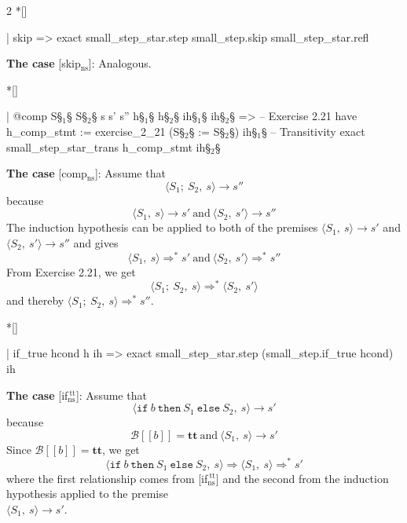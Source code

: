 \begin{paracol}{2}
\switchcolumn[1]*[]
\begin{leftcolumn}
    \begin{Lean_Code}
  | skip =>
    exact small_step_star.step
      small_step.skip
      small_step_star.refl
    \end{Lean_Code}
\end{leftcolumn}
\begin{rightcolumn}
\textbf{The case} [skip$_{\text{ns}}$]: Analogous.
\end{rightcolumn}
\vspace{2em}


\switchcolumn[1]*[]
\begin{leftcolumn}
    \begin{Lean_Code}
  | @comp S§\(_1\)§ S§\(_2\)§ s s' s''
    h§\(_1\)§ h§\(_2\)§ ih§\(_1\)§ ih§\(_2\)§ =>
    -- Exercise 2.21
    have h_comp_stmt :=
      exercise_2_21
      (S§\(_2\)§ := S§\(_2\)§) ih§\(_1\)§
    -- Transitivity
    exact
      small_step_star_trans
      h_comp_stmt ih§\(_2\)§
    \end{Lean_Code}
\end{leftcolumn}
\begin{rightcolumn}
\textbf{The case} [comp$_{\text{ns}}$]: Assume that
\[
\langle S_1;\ S_2,\ s \rangle \to s''
\]
because
\[
\langle S_1,\ s \rangle \to s'\ \mbox{and}\ \langle S_2,\ s' \rangle \to s''
\]
The induction hypothesis can be applied to both of the premises
\(\langle S_1,\ s \rangle \to s'\) and \(\langle S_2,\ s' \rangle \to s''\)
and gives
\[
\langle S_1,\ s \rangle \Rightarrow^{*} s'\ \mbox{and}\ \langle S_2,\ s' \rangle \Rightarrow^{*} s''
\]
From Exercise 2.21, we get
\[
\langle S_1;\ S_2,\ s \rangle \Rightarrow^{*} \langle S_2,\ s' \rangle
\]
and thereby \(\langle S_1;\ S_2,\ s \rangle \Rightarrow^{*} s''\).

\end{rightcolumn}
\vspace{2em}


\switchcolumn[1]*[]
\begin{leftcolumn}
    \begin{Lean_Code}
  | if_true hcond h ih =>
    exact small_step_star.step
      (small_step.if_true
        hcond)
      ih
    \end{Lean_Code}
\end{leftcolumn}
\begin{rightcolumn}
\textbf{The case} [if$_{\text{ns}}^{\ \text{tt}}$]: Assume that
\[
\langle \mathtt{if}\ b\ \mathtt{then}\ S_1\ \mathtt{else}\ S_2,\ s \rangle \to s'
\]
because
\[
\mathcal{B}[\![b]\!] = \mathbf{tt}\ \mbox{and}\ \langle S_1,\ s \rangle \to s'
\]
Since \(\mathcal{B}[\![b]\!] = \mathbf{tt}\), we get
\[
\langle \mathtt{if}\ b\ \mathtt{then}\ S_1\ \mathtt{else}\ S_2,\ s \rangle \Rightarrow \langle S_1,\ s \rangle \Rightarrow^{*} s'
\]
where the first relationship comes from [if$_{\text{ns}}^{\ \text{tt}}$] and the second
from the induction hypothesis applied to the premise\\
\(\langle S_1,\ s \rangle \to s'\).
\end{rightcolumn}
\vspace{2em}



\end{paracol}
